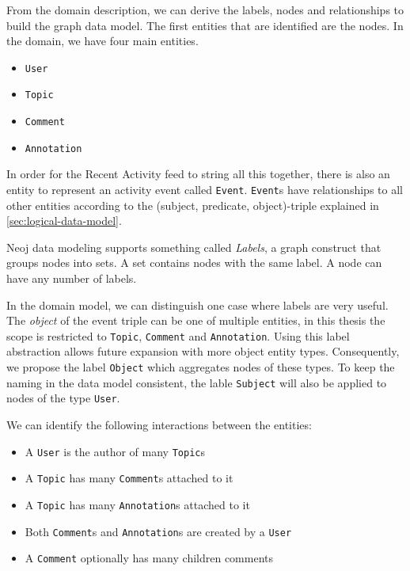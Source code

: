 






From the domain description, we can derive the labels, nodes and relationships to build the graph data model.
The first entities that are identified are the nodes.
In the domain, we have four main entities.

\begin{itemize}
  \item \texttt{User}
  \item \texttt{Topic}
  \item \texttt{Comment}
  \item \texttt{Annotation}
\end{itemize}

In order for the Recent Activity feed to string all this together, there is also an entity to represent an activity event called \texttt{Event}.
\texttt{Event}s have relationships to all other entities according to the (subject, predicate, object)-triple explained in \cref{sec:logical-data-model}.

Neoj data modeling supports something called \textit{Labels}, a graph construct that groups nodes into sets.
A set contains nodes with the same label.
A node can have any number of labels.

In the domain model, we can distinguish one case where labels are very useful.
The \textit{object} of the event triple can be one of multiple entities, in this thesis the scope is restricted to \texttt{Topic}, \texttt{Comment} and \texttt{Annotation}.
Using this label abstraction allows future expansion with more object entity types.
Consequently, we propose the label \texttt{Object} which aggregates nodes of these types.
To keep the naming in the data model consistent, the lable \texttt{Subject} will also be applied to nodes of the type \texttt{User}.

We can identify the following interactions between the entities:

\begin{itemize}
  \item A \texttt{User} is the author of many \texttt{Topic}s
  \item A \texttt{Topic} has many \texttt{Comment}s attached to it
  \item A \texttt{Topic} has many \texttt{Annotation}s attached to it
  \item Both \texttt{Comment}s and \texttt{Annotation}s are created by a \texttt{User}
  \item A \texttt{Comment} optionally has many children comments
\end{itemize}

